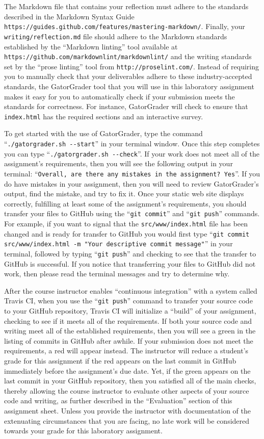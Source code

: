 \documentclass[11pt]{article}
\newcommand{\mainprogram}{\lstinline{index.html}}
\newcommand{\mainprogramsource}{\lstinline{src/www/index.html}}
\newcommand{\reflection}{\lstinline{writing/reflection.md}}
\newcommand{\gatorgraderstart}{\command{./gatorgrader.sh --start}}
\newcommand{\gatorgradercheck}{\command{./gatorgrader.sh --check}}
\newcommand{\gitcommit}{\command{git commit}}
\newcommand{\gitpush}{\command{git push}}
\newcommand{\gitcommitmainprogram}{\command{git commit src/www/index.html -m "Your
descriptive commit message"}}
\newcommand{\command}[1]{``\lstinline{#1}''}
\newcommand{\url}[1]{\lstinline{#1}}
\newcommand{\step}[1]{``{#1}''}
\newcommand{\checkmark}{\ding{51}}
\newcommand{\naughtmark}{\ding{55}}
\begin{document}
The Markdown file that contains your reflection must adhere to the standards
described in the Markdown Syntax Guide
\url{https://guides.github.com/features/mastering-markdown/}. Finally, your
\reflection{} file should adhere to the Markdown standards established by the
\step{Markdown linting} tool available at
\url{https://github.com/markdownlint/markdownlint/} and the writing standards
set by the \step{prose linting} tool from \url{http://proselint.com/}. Instead
of requiring you to manually check that your deliverables adhere to these
industry-accepted standards, the GatorGrader tool that you will use in this
laboratory assignment makes it easy for you to automatically check if your
submission meets the standards for correctness. For instance, GatorGrader will
check to ensure that \mainprogram{} has the required sections and an
interactive survey.

To get started with the use of GatorGrader, type the command \gatorgraderstart{}
in your terminal window. Once this step completes you can type
\gatorgradercheck{}. If your work does not meet all of the assignment's
requirements, then you will see the following output in your terminal:
\command{Overall, are there any mistakes in the assignment? Yes}. If you do have
mistakes in your assignment, then you will need to review GatorGrader's output,
find the mistake, and try to fix it. Once your static web site displays
correctly, fulfilling at least some of the assignment's requirements, you should
transfer your files to GitHub using the \gitcommit{} and \gitpush{} commands.
For example, if you want to signal that the \mainprogramsource{} file has been
changed and is ready for transfer to GitHub you would first type
\gitcommitmainprogram{} in your terminal, followed by typing \gitpush{} and
checking to see that the transfer to GitHub is successful. If you notice that
transferring your files to GitHub did not work, then please read the terminal
messages and try to determine why.

After the course instructor enables \step{continuous integration} with a system
called Travis CI, when you use the \gitpush{} command to transfer your source
code to your GitHub repository, Travis CI will initialize a \step{build} of your
assignment, checking to see if it meets all of the requirements. If both your
source code and writing meet all of the established requirements, then you will
see a green \checkmark{} in the listing of commits in GitHub after awhile. If
your submission does not meet the requirements, a red \naughtmark{} will appear
instead. The instructor will reduce a student's grade for this assignment if the
red \naughtmark{} appears on the last commit in GitHub immediately before the
assignment's due date. Yet, if the green \checkmark{} appears on the last commit
in your GitHub repository, then you satisfied all of the main checks, thereby
allowing the course instructor to evaluate other aspects of your source code and
writing, as further described in the \step{Evaluation} section of this
assignment sheet. Unless you provide the instructor with documentation of the
extenuating circumstances that you are facing, no late work will be considered
towards your grade for this laboratory assignment.
\end{document}
